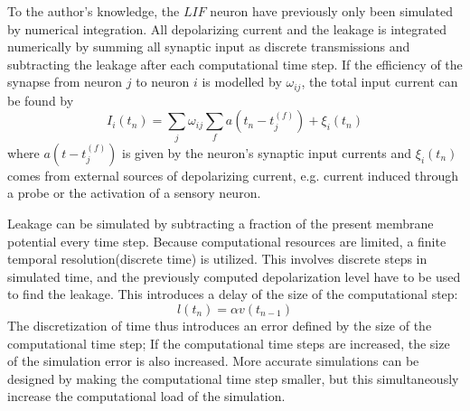 	To the author's knowledge, the $LIF$ neuron have previously only been simulated by numerical integration.
	All depolarizing current and the leakage is integrated numerically by summing all synaptic input as discrete transmissions and subtracting the leakage after each computational time step.
	If the efficiency of the synapse from neuron $j$ to neuron $i$ is modelled by $\omega_{ij}$, the total input current can be found by 
\begin{equation}
	I_i(t_n) = \sum_j \omega_{ij} \sum_f a(t_n - t_j^{(f)}) + \xi_i(t_n)
\end{equation}
	where $a(t- t_j^{(f)})$ is given by the neuron's synaptic input currents and $\xi_i(t_n)$ comes from external sources of depolarizing current, e.g. current induced through a probe or the activation of a sensory neuron\cite{florian03}.

	Leakage can be simulated by subtracting a fraction of the present membrane potential every time step.
	Because computational resources are limited, a finite temporal resolution(discrete time) is utilized.
	This involves discrete steps in simulated time, and the previously computed depolarization level have to be used to find the leakage.
	This introduces a delay of the size of the computational step:
\begin{equation}
	l(t_n) = \alpha v(t_{n-1})
\end{equation}
	The discretization of time thus introduces an error defined by the size of the computational time step;
		If the computational time steps are increased, the size of the simulation error is also increased.
	More accurate simulations can be designed by making the computational time step smaller, but this simultaneously increase the computational load of the simulation. %
	
